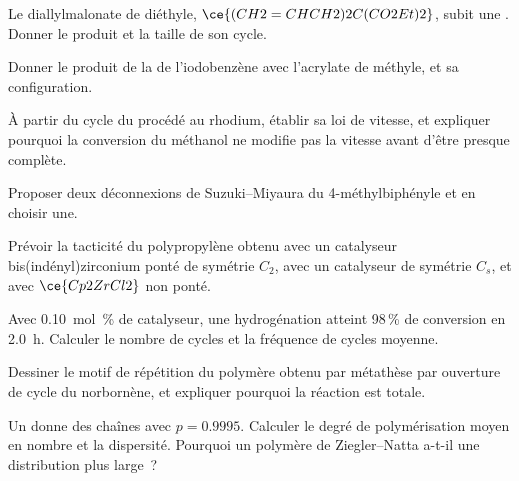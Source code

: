 \begin{exercise}[$\star$]\label{exo:b3:homogeneous-catalysis:3}
Le diallylmalonate de diéthyle, $\ce{(CH2=CHCH2)2C(CO2Et)2}$, subit une .
Donner le produit et la taille de son cycle.
\end{exercise}

\begin{exercise}[$\star$]\label{exo:b3:homogeneous-catalysis:4}
Donner le produit de la  de l'iodobenzène avec l'acrylate
de méthyle, et sa configuration.
\end{exercise}

\begin{exercise}[$\star\star$]\label{exo:b3:homogeneous-catalysis:5}
À partir du cycle du procédé au rhodium, établir sa loi de vitesse, et
expliquer pourquoi la conversion du méthanol ne modifie pas la vitesse
avant d'être presque complète.
\end{exercise}

\begin{exercise}[$\star\star$]\label{exo:b3:homogeneous-catalysis:6}
Proposer deux déconnexions de Suzuki--Miyaura du 4-méthylbiphényle et en choisir une.
\end{exercise}

\begin{exercise}[$\star\star$]\label{exo:b3:homogeneous-catalysis:7}
Prévoir la tacticité du polypropylène obtenu avec un catalyseur
bis(indényl)zirconium ponté de symétrie $C_2$, avec un catalyseur de
symétrie $C_s$, et avec $\ce{Cp2ZrCl2}$ non ponté.
\end{exercise}

\begin{exercise}[$\star\star$]\label{exo:b3:homogeneous-catalysis:8}
Avec \qty{0.10}{mol\%} de catalyseur, une hydrogénation atteint 98\,\% de conversion en \qty{2.0}{h}.
Calculer le nombre de cycles et la fréquence de cycles moyenne.
\end{exercise}

\begin{exercise}[$\star\star$]\label{exo:b3:homogeneous-catalysis:9}
Dessiner le motif de répétition du polymère obtenu par métathèse par
ouverture de cycle du norbornène, et expliquer pourquoi la réaction est
totale.
\end{exercise}

\begin{exercise}[$\star\star\star$]\label{exo:b3:homogeneous-catalysis:10}
Un  donne des chaînes avec $p = 0.9995$. Calculer le degré de
polymérisation moyen en nombre et la dispersité. Pourquoi un polymère de
Ziegler--Natta a-t-il une distribution plus large~?
\end{exercise}

